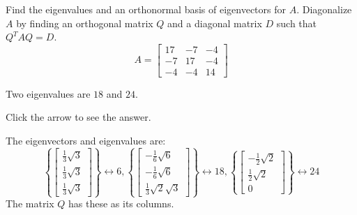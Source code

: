 \documentclass{ximera}
\begin{document}
 \begin{problem}\label{prb:9.4} Find the eigenvalues and an orthonormal basis of eigenvectors for $A.$
Diagonalize $A$ by finding an orthogonal matrix $Q$ and a diagonal matrix $D$
such that $Q^{T}AQ=D$.
\begin{equation*}
A=\left[
\begin{array}{rrr}
17 & -7 & -4 \\
-7 & 17 & -4 \\
-4 & -4 & 14
\end{array}
\right]
\end{equation*}

\begin{hint} 
Two eigenvalues are $18$ and $24$.

Click the arrow to see the answer. \begin{expandable}
The eigenvectors and eigenvalues are:
\[
\left\{ \left[
\begin{array}{c}
\frac{1}{3}\sqrt{3} \\
\frac{1}{3}\sqrt{3} \\
\frac{1}{3}\sqrt{3}
\end{array}
\right] \right\} \leftrightarrow 6,\left\{ \left[
\begin{array}{c}
-\frac{1}{6}\sqrt{6} \\
-\frac{1}{6}\sqrt{6} \\
\frac{1}{3}\sqrt{2}\sqrt{3}
\end{array}
\right] \right\} \leftrightarrow 18,\left\{ \left[
\begin{array}{c}
-\frac{1}{2}\sqrt{2} \\
\frac{1}{2}\sqrt{2} \\
0
\end{array}
\right] \right\} \leftrightarrow 24
\]
The matrix $Q$ has these as its columns.
\end{expandable} \end{hint}
\end{problem}
\end{document}
